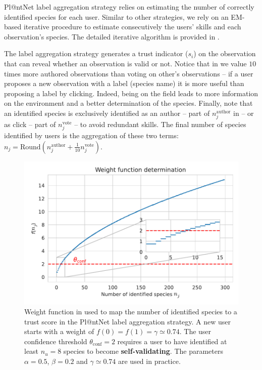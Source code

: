 Pl@ntNet label aggregation strategy relies on estimating the number of correctly identified species for each user.
Similar to other strategies, we rely on an EM-based iterative procedure \citep{Dempster_Laird_Rubin77} to estimate consecutively the users' skills and each observation's species. The detailed iterative algorithm is provided in .

The label aggregation strategy generates a trust indicator ($s_i$) on the observation that can reveal whether an observation is valid or not.
Notice that in  we value $10$ times more authored observations than voting on other's observations -- if a user proposes a new observation with a label (species name) it is more useful than proposing a label by clicking.
Indeed, being on the field leads to more information on the environment and a better determination of the species.
Finally, note that an identified species is exclusively identified as an author -- part of $n_j^\text{author}$ in  -- or as click -- part of $n_j^\text{vote}$ -- to avoid redundant skills.
The final number of species identified by users is the aggregation of these two terms: $n_j = \mathrm{Round}\left(n_j^\text{author} + \frac{1}{10}n_j^\text{vote}\right)$.

\begin{figure}[htb]
    \centering
    \includegraphics[width=.75\textwidth]{./images_plantnet/weight_function.pdf}
    \caption{Weight function in  used to map the number of identified species to a trust score in the Pl@ntNet label aggregation strategy.  A new user starts with a weight of $f(0)=f(1)=\gamma\simeq 0.74$. The user confidence threshold $\theta_{\text{conf}}=2$ requires a user to have identified at least $n_u=8$ species to become \textbf{self-validating}. The parameters $\alpha=0.5$, $\beta=0.2$ and $\gamma\simeq 0.74$ are used in practice.}
    \label{fig:weight_function}
\end{figure}

